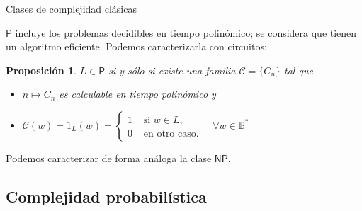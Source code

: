 \documentclass[ignorenonframetext,aspectratio=43,]{beamer}
\providecommand{\tightlist}{%
  \setlength{\itemsep}{0pt}\setlength{\parskip}{0pt}}
\newtheorem{proposicion}{Proposición}
\newcommand{\BB}{\mathbb{B}}
\begin{document}
\begin{frame}{Clases de complejidad clásicas}

  $\mathsf{P}$ incluye los problemas decidibles en tiempo polinómico;
  se considera que tienen un algoritmo eficiente. Podemos caracterizarla con circuitos:

  \begin{proposicion}
    $L \in \mathsf{P}$ si y sólo si existe una familia $\mathcal{C} = \{C_n\}$ tal que
    \begin{itemize}
      \tightlist
    \item $n \mapsto C_n$ es calculable en tiempo polinómico y
    \item $\mathcal{C}(w) = 1_L(w) = \begin{cases}1 & \text{ si } w \in L, \\ 0 & \text{ en otro caso.}\end{cases} \quad \forall w \in \BB^\ast$
    \end{itemize}
  \end{proposicion}

  Podemos caracterizar de forma análoga la clase $\mathsf{NP}$.

\end{frame}

\subsection{Complejidad probabilística}
\end{document}
